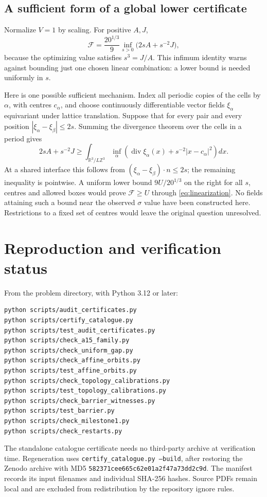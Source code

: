 \documentclass[11pt,a4paper]{report}
\newcommand{\DF}{\mathcal F}
\begin{document}
\subsection{A sufficient form of a global lower certificate}

Normalize $V=1$ by scaling. For positive $A,J$,
\begin{equation}\label{eq:linearization}
 \DF=\frac{20^{1/3}}9\inf_{s>0}\bigl(2sA+s^{-2}J\bigr),
\end{equation}
because the optimizing value satisfies $s^3=J/A$.
This infimum identity warns against bounding just one chosen linear
combination: a lower bound is needed uniformly in $s$.

Here is one possible sufficient mechanism. Index all periodic copies of
the cells by $\alpha$, with centres $c_\alpha$, and choose continuously
differentiable vector fields $\xi_\alpha$ equivariant under lattice
translation. Suppose that for every pair and every position
$|\xi_\alpha-\xi_\beta|\leq2s$. Summing the divergence theorem over
the cells in a period gives
\[
 2sA+s^{-2}J\geq
 \int_{\mathbb R^3/L\mathbb Z^3}
 \inf_\alpha\left(\operatorname{div}\xi_\alpha(x)
                  +s^{-2}|x-c_\alpha|^2\right)dx.
\]
At a shared interface this follows from
$(\xi_\alpha-\xi_\beta)\cdot n\leq2s$; the remaining inequality is
pointwise. A uniform lower bound $9U/20^{1/3}$ on the right for all $s$,
centres and allowed boxes would prove $\DF\geq U$ through
\eqref{eq:linearization}. No fields attaining such a bound near the
observed $\sigma$ value have been constructed here. Restrictions to a
fixed set of centres would leave the original question unresolved.

\clearpage
\section{Reproduction and verification status}

From the problem directory, with Python 3.12 or later:
\begin{verbatim}
python scripts/audit_certificates.py
python scripts/certify_catalogue.py
python scripts/test_audit_certificates.py
python scripts/check_a15_family.py
python scripts/check_uniform_gap.py
python scripts/check_affine_orbits.py
python scripts/test_affine_orbits.py
python scripts/check_topology_calibrations.py
python scripts/test_topology_calibrations.py
python scripts/check_barrier_witnesses.py
python scripts/test_barrier.py
python scripts/check_milestone1.py
python scripts/check_restarts.py
\end{verbatim}
The standalone catalogue certificate needs no third-party archive at
verification time. Regeneration uses
\texttt{certify\_catalogue.py --build}, after restoring the Zenodo archive
with MD5 \texttt{582371cee665c62e01a2f47a73dd2c9d}. The manifest records
its input filenames and individual SHA-256 hashes. Source PDFs remain
local and are excluded from redistribution by the repository ignore rules.
\end{document}
